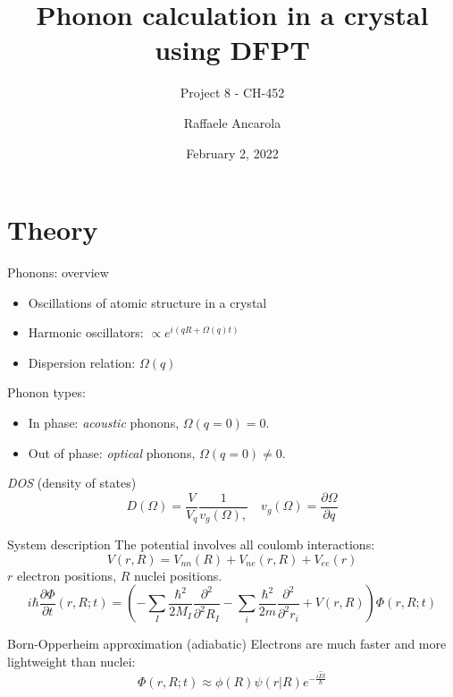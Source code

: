 \documentclass[dvipsnames]{beamer}
\author{Raffaele Ancarola}
\title{Phonon calculation in a crystal using DFPT}
\subtitle{Project 8 - CH-452}
\institute{EPFL}
\date{February 2, 2022}
\newcommand{\diff}[2]{\frac{\partial #1}{\partial #2}}
\newcommand{\ddiffx}[1]{\frac{\partial^2 }{\partial^2 #1}}
\begin{document}
	\begin{frame}
		\titlepage
	\end{frame}
	
	\begin{frame}
		\tableofcontents[sectionstyle=show,subsectionstyle=show/shaded/hide,subsubsectionstyle=show/shaded/hide]
	\end{frame}
		
	
	\section{Theory}
	
	    \begin{frame}{Phonons: overview}
		
		\begin{itemize}
		\item Oscillations of atomic structure in a crystal
		\item Harmonic oscillators: $\propto e^{i(qR+\Omega(q)t)} $
		\item Dispersion relation: $\Omega(q)$
		\end{itemize}
		
		\begin{exampleblock}{Phonon types:}
		\begin{itemize}
		\item In phase: \textit{acoustic} phonons, $\Omega(q= 0) = 0$.
		\item Out of phase: \textit{optical} phonons, $\Omega(q=0) \neq 0$.
		\end{itemize}
		\end{exampleblock}
		
		\begin{exampleblock}{\textit{DOS} (density of states)}
		\[ D(\Omega) = \frac{V}{V_q} \frac{1}{v_g(\Omega),} \quad v_g(\Omega) = \diff{\Omega}{q}\]
		\end{exampleblock}
		\end{frame}
	
		\begin{frame}{System description \cite{qetuto}}
		The potential involves all coulomb interactions:
		\[ V(r, R) = V_{nn}(R) + V_{ne}(r,R) + V_{ee}(r) \]
		$r$ electron positions, $R$ nuclei positions.
		\[i \hbar \diff{\Phi}{t}(r,R;t) = \left(-\sum_I\frac{\hbar^2}{2M_I}\ddiffx{R_I} - \sum_i \frac{\hbar^2}{2m} \ddiffx{r_i} + V(r, R) \right)\Phi(r,R;t)\]
		\begin{block}{Born-Opperheim approximation (adiabatic)}
		Electrons are much faster and more lightweight than nuclei:
		\[ \Phi(r,R;t) \approx \phi(R) \psi(r|R) e^{-\frac{i\hat{E}t}{\hbar}}\]
		\end{block}
		\end{frame}
		
\end{document}
